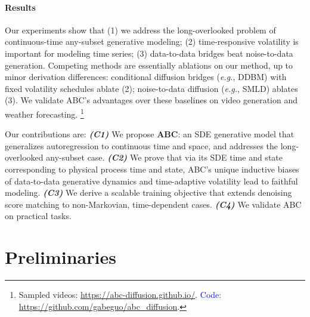 \documentclass{article}
\begin{document}

\paragraph{Results}

Our experiments show that (1) we address the long-overlooked problem of continuous-time any-subset generative modeling; (2) time-responsive volatility is important for modeling time series; (3) data-to-data bridges beat noise-to-data generation.
Competing methods are essentially ablations on our method, up to minor derivation differences: conditional diffusion bridges (\textit{e.g.}, DDBM) \cite{zhou2023denoising, liu2022let} with fixed volatility schedules ablate (2); noise-to-data diffusion (\textit{e.g.}, SMLD) \cite{song2020score} ablates (3).
We validate ABC's advantages over these baselines on video generation and weather forecasting.
\footnote{Sampled videos: \href{https://abc-diffusion.github.io/}{https://abc-diffusion.github.io/}. \textcolor{blue}{Code: \href{https://github.com/gabeguo/abc_diffusion}{https://github.com/gabeguo/abc\_diffusion}.}
}%
%

Our contributions are:
\textit{\textbf{(C1)}} We propose \textbf{ABC}: an SDE generative model that generalizes autoregression to continuous time and space, and addresses the long-overlooked any-subset case.
\textit{\textbf{(C2)}} We prove that via its SDE time and state corresponding to physical process time and state, ABC's unique inductive biases of data-to-data generative dynamics and time-adaptive volatility lead to faithful modeling.
\textit{\textbf{(C3)}} We derive a scalable training objective that extends denoising score matching to non-Markovian, time-dependent cases.
\textit{\textbf{(C4)}} We validate ABC on practical tasks.


\section{Preliminaries}
\end{document}
